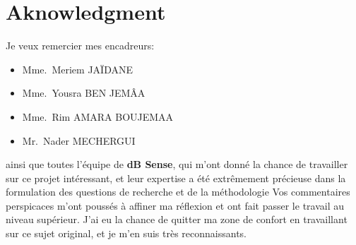 \chapter*{Aknowledgment}

Je veux remercier mes encadreurs:
\begin{itemize}
	\item Mme.\ Meriem JAÏDANE
	\item Mme.\ Yousra BEN JEMÂA
	\item Mme.\ Rim AMARA BOUJEMAA
	\item Mr.\ Nader MECHERGUI
\end{itemize}
ainsi que toutes l'équipe de \textbf{dB Sense}, qui m'ont donné la chance de travailler sur ce projet intéressant, et leur expertise a été extrêmement précieuse dans la formulation des questions de recherche et de la méthodologie
\newline Vos commentaires perspicaces m'ont poussés à affiner ma réflexion et ont fait passer le travail au niveau supérieur.
\newline 
J'ai eu la chance de quitter ma zone de confort en travaillant sur ce sujet original, et je m'en suis très reconnaissants.





